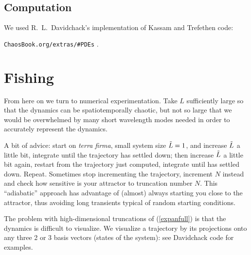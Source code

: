 \documentclass[letterpaper,10pt,fleqn,notitlepage]{article}
\begin{document}
\subsection{Computation}

We used R.~L.~Davidchack's implementation of Kassam and Trefethen code\cite{ks04com}:

{\tt ChaosBook.org/extras/\#PDEs} .

\section{Fishing}

From here on we turn to numerical experimentation.
Take $L$ sufficiently large so that the
dynamics can be spatiotemporally chaotic, but not so large that we would be
overwhelmed by many short wavelength modes needed in order to accurately
represent the dynamics.

A bit of advice: start on {\em terra firma}, 
small system size  $\tilde{L} = 1$, 
and increase  $\tilde{L}$ a little bit, integrate until the
trajectory has settled down; then increase  $\tilde{L}$ a little bit again,
restart from the trajectory just computed, 
integrate until has settled down. 
Repeat. Sometimes stop incrementing
the trajectory, increment $N$ instead and check how sensitive is your
attractor to truncation number $N$. This ``adiabatic''
approach has advantage of (almost) always starting you close to
the attractor, thus avoiding long transients typical of random
starting conditions.

The problem with high-dimensional truncations of (\ref{expanfull})
is that the dynamics is difficult to visualize. 
We visualize a trajectory by its projections onto any three 
2 or 3 basis vectors (states of the system):
see Davidchack code for  examples.
\end{document}
